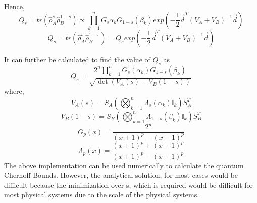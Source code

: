 Hence,
$$Q_s = tr(\hat{\rho}_A^s \hat{\rho}_B^{1 - s}) \propto \prod_{k=1}^{n} G_s{\alpha_k} G_{1 - s}(\beta_k) exp\left(-\frac{1}{2}\vec{d}^T(V_A + V_B)^{-1} \vec{d}\right)$$
$$Q_s = tr(\hat{\rho}_A^s \hat{\rho}_B^{1 - s}) = \bar{Q}_s exp\left(-\frac{1}{2}\vec{d}^T(V_A + V_B)^{-1} \vec{d}\right)$$


It can further be calculated to find the value of $\bar{Q_s}$ as 
$$\bar{Q}_s = \frac{2^n \prod_{k=1}^{n} G_s(\alpha_k) G_{1-s}(\beta_k)}{\sqrt{\det\left(V_A(s) + V_B(1-s)\right)}}$$
where,
$$V_A(s) = S_A \left( \bigotimes_{k=1}^{n} \Lambda_s(\alpha_k) \mathbb{I}_k \right) S_A^T$$
$$V_B(1-s) = S_B \left( \bigotimes_{k=1}^{n} \Lambda_{1-s}(\beta_k) \mathbb{I}_k \right) S_B^T$$
$$G_p(x) = \frac{2^p}{(x+1)^p - (x-1)^p}$$
$$\Lambda_p(x) = \frac{(x+1)^p + (x-1)^p}{(x+1)^p - (x-1)^p}$$
The above implementation can be used numerically to calculate the quantum Chernoff Bounds. However, the analytical solution, for most cases would be difficult because the minimization over s, which is required would be difficult for most physical systems due to the scale of the physical systems.